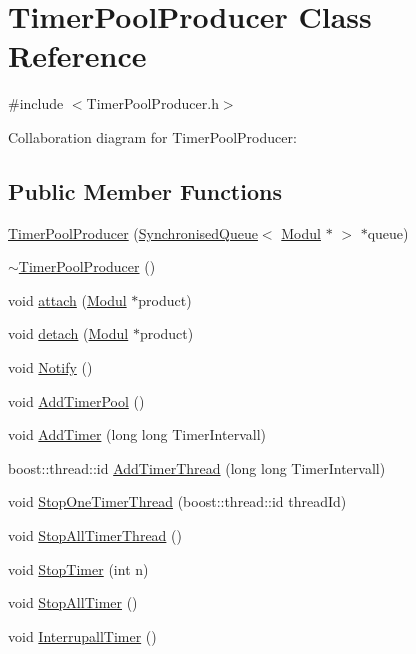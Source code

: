 \hypertarget{classTimerPoolProducer}{\section{\-Timer\-Pool\-Producer \-Class \-Reference}
\label{classTimerPoolProducer}
}


{\ttfamily \#include $<$\-Timer\-Pool\-Producer.\-h$>$}



\-Collaboration diagram for \-Timer\-Pool\-Producer\-:
\subsection*{\-Public \-Member \-Functions}
\begin{DoxyCompactItemize}
\item 
\hyperlink{classTimerPoolProducer_a1c5230341adf77ea623817fc8aed4d2d}{\-Timer\-Pool\-Producer} (\hyperlink{classSynchronisedQueue}{\-Synchronised\-Queue}$<$ \hyperlink{classModul}{\-Modul} $\ast$ $>$ $\ast$queue)
\item 
\hyperlink{classTimerPoolProducer_a84c1edeb70b7a0d00d832ee9221af53d}{$\sim$\-Timer\-Pool\-Producer} ()
\item 
void \hyperlink{classTimerPoolProducer_a4e2babcd8ca46c64482929df58c2609c}{attach} (\hyperlink{classModul}{\-Modul} $\ast$product)
\item 
void \hyperlink{classTimerPoolProducer_adaac18d6c1cf1a6219c393879e026076}{detach} (\hyperlink{classModul}{\-Modul} $\ast$product)
\item 
void \hyperlink{classTimerPoolProducer_af72ce21fe82ca390d6933dc3cf2a433e}{\-Notify} ()
\item 
void \hyperlink{classTimerPoolProducer_a765a24710022eca32c9a446f575f9a8d}{\-Add\-Timer\-Pool} ()
\item 
void \hyperlink{classTimerPoolProducer_abd7029bf92e829eae0264b9abeb1184f}{\-Add\-Timer} (long long \-Timer\-Intervall)
\item 
boost\-::thread\-::id \hyperlink{classTimerPoolProducer_a551646d28abe29b451e1bcca031b7c8a}{\-Add\-Timer\-Thread} (long long \-Timer\-Intervall)
\item 
void \hyperlink{classTimerPoolProducer_ab6a97601109a1857bd2f58496cf9015a}{\-Stop\-One\-Timer\-Thread} (boost\-::thread\-::id thread\-Id)
\item 
void \hyperlink{classTimerPoolProducer_ab6bea328d23424335964ffbda6acef3a}{\-Stop\-All\-Timer\-Thread} ()
\item 
void \hyperlink{classTimerPoolProducer_a1b21ebcf38f8a2fb049bafee81776d04}{\-Stop\-Timer} (int n)
\item 
void \hyperlink{classTimerPoolProducer_a681e4af4f6cbd9c3fa5f2c60a031ba62}{\-Stop\-All\-Timer} ()
\item 
void \hyperlink{classTimerPoolProducer_a1684543a38e60b57de8505072a3eae2f}{\-Interrupall\-Timer} ()
\end{DoxyCompactItemize}

